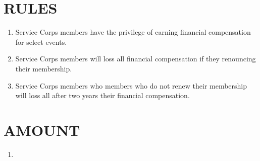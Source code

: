 \documentclass{Service_Corps_Document}
\begin{document}
\def \Title {Financial Compensation}
\def \Company {Service Corps}
\def \versionNumber {1.0}
\stdFooter
\begin{titlepage}
	\stdTitlePage
\end{titlepage}

\tableofcontents	
		
\newpage
\section{RULES}
\begin{enumerate}
	\item Service Corps members have the privilege of earning financial compensation for select events.
	\item Service Corps members will loss all financial compensation if they renouncing their membership.
	\item Service Corps members who members who do not renew their membership will loss all after two years their financial compensation.
\end{enumerate}
\section{AMOUNT}
\begin{enumerate}
	\item 
\end{enumerate}
\end{document}
